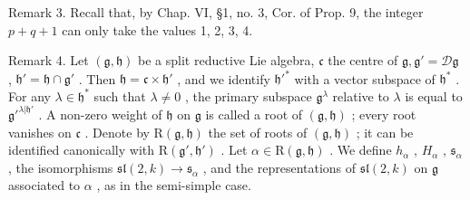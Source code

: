 Remark 3. Recall that, by Chap. VI, §1, no. 3, Cor. of Prop. 9, the integer \(p + q + 1\) can only take the values 1, 2, 3, 4.

Remark 4. Let \((\mathfrak{g},\mathfrak{h})\) be a split reductive Lie algebra, \(\mathfrak{c}\) the centre of \(\mathfrak{g},\mathfrak{g}' = \mathcal{D}\mathfrak{g}\) , \(\mathfrak{h}' = \mathfrak{h} \cap \mathfrak{g}'\) . Then \(\mathfrak{h} = \mathfrak{c} \times \mathfrak{h}'\) , and we identify \(\mathfrak{h}'^*\) with a vector subspace of \(\mathfrak{h}^*\) . For any \(\lambda \in \mathfrak{h}^*\) such that \(\lambda \neq 0\) , the primary subspace \(\mathfrak{g}^\lambda\) relative to \(\lambda\) is equal to \(\mathfrak{g}'^{\lambda | \mathfrak{h}'}\) . A non-zero weight of \(\mathfrak{h}\) on \(\mathfrak{g}\) is called a root of \((\mathfrak{g},\mathfrak{h})\) ; every root vanishes on \(\mathfrak{c}\) . Denote by \(\mathrm{R}(\mathfrak{g},\mathfrak{h})\) the set of roots of \((\mathfrak{g},\mathfrak{h})\) ; it can be identified canonically with \(\mathrm{R}(\mathfrak{g}',\mathfrak{h}')\) . Let \(\alpha \in \mathrm{R}(\mathfrak{g},\mathfrak{h})\) . We define \(h_\alpha\) , \(H_\alpha\) , \(\mathfrak{s}_\alpha\) , the isomorphisms \(\mathfrak{sl}(2,k) \to \mathfrak{s}_\alpha\) , and the representations of \(\mathfrak{sl}(2,k)\) on \(\mathfrak{g}\) associated to \(\alpha\) , as in the semi-simple case.

